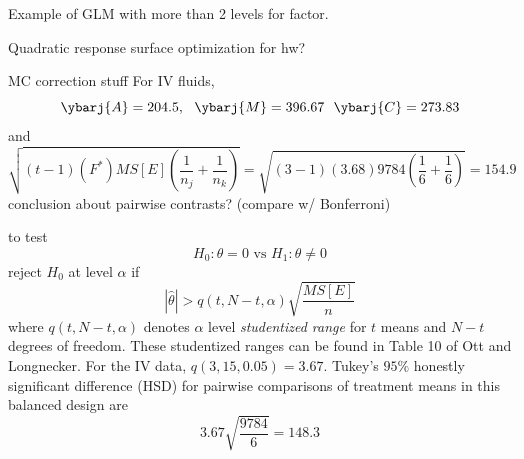 


Example of GLM with more than 2 levels for factor.


Quadratic response surface optimization for hw?






MC correction stuff
\bigkn
For IV fluids, 
$$ \ybarj{A}=204.5, \ \ \ybarj{M}=396.67 \ \ \ybarj{C}=273.83 $$
and
$$ \sqrt{(t-1) (F^{*}) MS[E] \left(\frac{1}{n_j} + \frac{1}{n_k}\right)}= \sqrt{(3-1) (3.68)  9784 (\frac{1}{6}+\frac{1}{6})} =154.9 $$
conclusion about pairwise contrasts?  (compare w/ Bonferroni)





to test
$$H_0: \theta=0 \mbox{ vs } H_1: \theta\neq 0$$
reject $H_0$ at level $\alpha$ if 
$$ |\hat\theta| > q(t,N-t,\alpha) \sqrt{\frac{MS[E]}{n}}$$
where $q(t,N-t,\alpha)$ denotes $\alpha$ level 
{\em studentized range} for $t$ means and $N-t$ degrees of freedom.
These studentized ranges can be found in Table 10 of Ott and Longnecker.
\bigkn
For the IV data, $q(3,15,0.05)=3.67$.  Tukey's $95\%$ 
honestly significant difference (HSD) for pairwise comparisons
of treatment means in this balanced design are
$$ 3.67\sqrt{\frac{9784}{6}}=148.3$$





